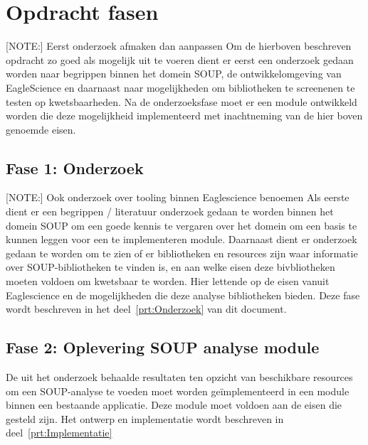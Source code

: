 \section{Opdracht fasen}\label{sec:opdracht-fasen}
[NOTE:] Eerst onderzoek afmaken dan aanpassen
Om de hierboven beschreven opdracht zo goed als mogelijk uit te voeren dient er eerst een onderzoek gedaan worden naar begrippen binnen het domein SOUP, de ontwikkelomgeving van EagleScience en daarnaast naar mogelijkheden om bibliotheken te screenenen te testen op kwetsbaarheden. Na de onderzoeksfase moet er een module ontwikkeld worden die deze mogelijkheid implementeerd met inachtneming van de  hier boven genoemde eisen.

\subsection{Fase 1: Onderzoek} \label{subsec:fase-1:-onderzoek}
[NOTE:] Ook onderzoek over tooling binnen Eaglescience benoemen
Als eerste dient er een begrippen / literatuur onderzoek gedaan te worden binnen het domein SOUP om een goede kennis te vergaren over het domein om een basis te kunnen leggen voor een te implementeren module. Daarnaast dient er onderzoek gedaan te worden om te zien of er bibliotheken en resources zijn waar informatie over SOUP-bibliotheken te vinden is, en aan welke eisen deze bivbliotheken moeten voldoen om kwetsbaar te worden. Hier lettende op de eisen vanuit Eaglescience en de mogelijkheden die deze analyse bibliotheken bieden. Deze fase wordt beschreven in het deel~\ref{prt:Onderzoek} van dit document.

\subsection{Fase 2: Oplevering SOUP analyse module}\label{subsec:fase-2:-oplevering-soup-analyse-module}
De uit het onderzoek behaalde resultaten ten opzicht van beschikbare resources om een SOUP-analyse te voeden moet worden geïmplementeerd in een module binnen een bestaande applicatie. Deze module moet voldoen aan de eisen die gesteld zijn. Het ontwerp en implementatie wordt beschreven in deel~\ref{prt:Implementatie}

